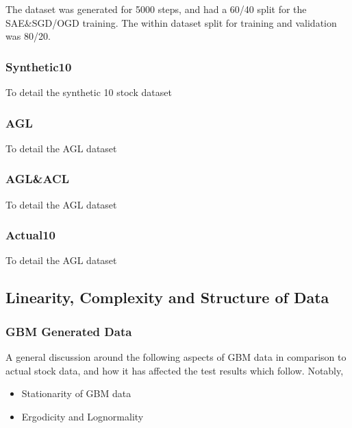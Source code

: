 \documentclass[a4paper,latin]{paper}
\begin{document}
The dataset was generated for 5000 steps, and had a 60/40 split for the SAE\&SGD/OGD training. The within dataset split for training and validation was 80/20. 

\subsubsection{Synthetic10}\label{dataset_synthetic10}

To detail the synthetic 10 stock dataset

\subsubsection{AGL}\label{dataset_agl}

To detail the AGL dataset

\subsubsection{AGL\&ACL}\label{dataset_aglacl}

To detail the AGL dataset

\subsubsection{Actual10}\label{dataset_actual10}

To detail the AGL dataset

\subsection{Linearity, Complexity and Structure of Data}

\subsubsection{GBM Generated Data}\label{results_gbm_data}

A general discussion around the following aspects of GBM data in comparison to actual stock data, and how it has affected the test results which follow. Notably, 
\begin{itemize}
	\item Stationarity of GBM data
	\item Ergodicity and Lognormality 
\end{itemize}

\end{document}
